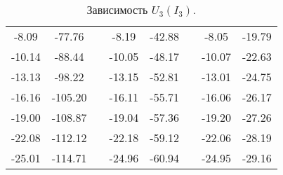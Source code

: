 \begin{table}
\begin{tabular}{|c|c|c|c|c|c|c|c|}
 \\ \cline{1-2} \cline{4-5} \cline{7-8}
 -8.09 &  -77.76 & &  -8.19 & -42.88 & &  -8.05 & -19.79 
 \\ \cline{1-2} \cline{4-5} \cline{7-8}
-10.14 &  -88.44 & & -10.05 & -48.17 & & -10.07 & -22.63 
\\ \cline{1-2} \cline{4-5} \cline{7-8}
-13.13 &  -98.22 & & -13.15 & -52.81 & & -13.01 & -24.75 
\\ \cline{1-2} \cline{4-5} \cline{7-8}
-16.16 & -105.20 & & -16.11 & -55.71 & & -16.06 & -26.17 
\\ \cline{1-2} \cline{4-5} \cline{7-8}
-19.00 & -108.87 & & -19.04 & -57.36 & & -19.20 & -27.26 
\\ \cline{1-2} \cline{4-5} \cline{7-8}
-22.08 & -112.12 & & -22.18 & -59.12 & & -22.06 & -28.19 
\\ \cline{1-2} \cline{4-5} \cline{7-8}
-25.01 & -114.71 & & -24.96 & -60.94 & & -24.95 & -29.16 
\\ \cline{1-2} \cline{4-5} \cline{7-8}
\end{tabular}
\caption{Зависимость $U_3(I_3)$.}
\end{table} 
 

 













 




